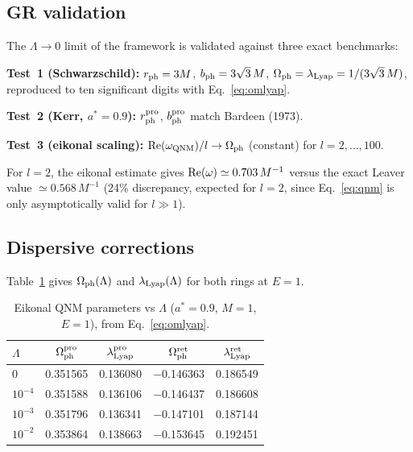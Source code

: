 \documentclass[12pt,a4paper]{article}
\newcommand{\Omph}{\Omega_{\rm ph}}
\newcommand{\lLyap}{\lambda_{\rm Lyap}}
\begin{document}
\subsection{GR validation}

The $\Lambda\to0$ limit of the framework is validated against three
exact benchmarks:

\textbf{Test~1 (Schwarzschild):}
$r_{\rm ph}=3M$, $b_{\rm ph}=3\sqrt{3}\,M$,
$\Omph=\lLyap=1/(3\sqrt{3}\,M)$,
reproduced to ten significant digits with Eq.~\eqref{eq:omlyap}. \checkmark

\textbf{Test~2 (Kerr, $a^*=0.9$):}
$r_{\rm ph}^{\rm pro}$, $b_{\rm ph}^{\rm pro}$ match Bardeen (1973). \checkmark

\textbf{Test~3 (eikonal scaling):}
${\rm Re}(\omega_{\rm QNM})/l\to\Omph$ (constant) for $l=2,\ldots,100$. \checkmark

For $l=2$, the eikonal estimate gives
${\rm Re}(\omega)\simeq 0.703\,M^{-1}$ versus the exact Leaver value
$\simeq 0.568\,M^{-1}$ \citep{Berti2009} (24\% discrepancy, expected for $l=2$,
since Eq.~\eqref{eq:qnm} is only asymptotically valid for $l\gg1$).

\subsection{Dispersive corrections}

Table~\ref{tab:qnm} gives $\Omph(\Lambda)$ and $\lLyap(\Lambda)$
for both rings at $E=1$.

\begin{table}[h]
\centering
\caption{Eikonal QNM parameters vs $\Lambda$ ($a^*=0.9$, $M=1$, $E=1$), from
Eq.~\eqref{eq:omlyap}.}
\label{tab:qnm}
\begin{tabular}{lcccc}
\toprule
$\Lambda$ & $\Omph^{\rm pro}$ & $\lLyap^{\rm pro}$ & $\Omph^{\rm ret}$ & $\lLyap^{\rm ret}$ \\
\midrule
$0$       & 0.351565 & 0.136080 & $-$0.146363 & 0.186549 \\
$10^{-4}$ & 0.351588 & 0.136106 & $-$0.146437 & 0.186608 \\
$10^{-3}$ & 0.351796 & 0.136341 & $-$0.147101 & 0.187144 \\
$10^{-2}$ & 0.353864 & 0.138663 & $-$0.153645 & 0.192451 \\
\bottomrule
\end{tabular}
\end{table}
\end{document}
